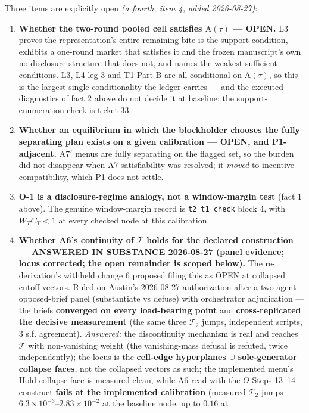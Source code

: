 \documentclass[11pt,a4paper]{article}
\newcommand{\Tmap}{\mathcal{T}}
\newcommand{\Atau}{\mathrm{A}(\tau)}
\begin{document}
Three items are explicitly open \emph{(a fourth, item 4, added 2026-08-27)}:
\begin{enumerate}
\item \textbf{Whether the two-round pooled cell satisfies $\Atau$ --- OPEN.} L3
  proves the representation's entire remaining bite is the support condition,
  exhibits a one-round market that satisfies it and the frozen manuscript's own
  no-disclosure structure that does not, and names the weakest sufficient conditions.
  L3, L4 leg 3 and T1 Part B are all conditional on $\Atau$, so this is the largest
  single conditionality the ledger carries --- and the executed diagnostics of fact 2
  above do not decide it at baseline; the support-enumeration check is ticket 33.
\item \textbf{Whether an equilibrium in which the blockholder chooses the fully
  separating plan exists on a given calibration --- OPEN, and P1-adjacent.} A7$'$
  menus are fully separating on the flagged set, so the burden did not disappear when
  A7 satisfiability was resolved; it \emph{moved} to incentive compatibility, which
  P1 does not settle.
\item \textbf{O-1 is a disclosure-regime analogy, not a window-margin test} (fact 1
  above). The genuine window-margin record is \texttt{t2\_t1\_check} block 4, with
  $W_TC_T<1$ at every checked node at this calibration.
\item \textbf{Whether A6's continuity of $\Tmap$ holds for the declared construction ---
  ANSWERED IN SUBSTANCE 2026-08-27 (panel evidence; locus corrected; the open remainder
  is scoped below).} The re-derivation's withheld change 6 proposed filing this as OPEN
  at collapsed cutoff vectors. Ruled on Austin's 2026-08-27 authorization after a
  two-agent opposed-brief panel (substantiate vs defuse) with orchestrator adjudication
  --- the briefs \textbf{converged on every load-bearing point} and
  \textbf{cross-replicated the decisive measurement} (the same three $\Tmap_2$ jumps,
  independent scripts, 3 s.f. agreement). \emph{Answered:} the discontinuity mechanism is
  real and reaches $\Tmap$ with non-vanishing weight (the vanishing-mass defusal is
  refuted, twice independently); the locus is the \textbf{cell-edge hyperplanes $\cup$
  sole-generator collapse faces}, not the collapsed vectors as such; the implemented
  menu's Hold-collapse face is measured clean, while A6 read with the $\Theta$
  Steps 13--14 construct \textbf{fails at the implemented calibration} (measured $\Tmap_2$
  jumps $6.3\times10^{-3}$--$2.83\times10^{-2}$ at the baseline node, up to $0.16$ at

\end{enumerate}
\end{document}
